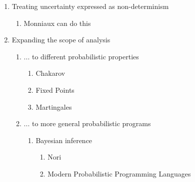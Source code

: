 \begin{enumerate}
 \item Treating uncertainty expressed as non-determinism
   \begin{enumerate}
    \item Monniaux can do this 
   \end{enumerate}

 \item Expanding the scope of analysis
   \begin{enumerate}
    \item ... to different probabilistic properties
      \begin{enumerate}
        \item Chakarov
        \item Fixed Points
        \item Martingales
      \end{enumerate}
    \item ... to more general probabilistic programs
      \begin{enumerate}
        \item Bayesian inference
          \begin{enumerate}
            \item Nori
            \item Modern Probabilistic Programming Languages
          \end{enumerate}
      \end{enumerate}
   \end{enumerate}

\end{enumerate}
